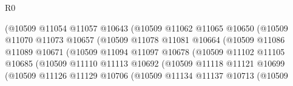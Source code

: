 \begin{lexlean}{R0}
\begin{coremodule}
                                        (@10509
                                          @11054
                                          @11057
                                          @10643
                                          (@10509
                                            @11062
                                            @11065
                                            @10650
                                            (@10509
                                              @11070
                                              @11073
                                              @10657
                                              (@10509
                                                @11078
                                                @11081
                                                @10664
                                                (@10509
                                                  @11086
                                                  @11089
                                                  @10671
                                                  (@10509
                                                    @11094
                                                    @11097
                                                    @10678
                                                    (@10509
                                                      @11102
                                                      @11105
                                                      @10685
                                                      (@10509
                                                        @11110
                                                        @11113
                                                        @10692
                                                        (@10509
                                                          @11118
                                                          @11121
                                                          @10699
                                                          (@10509
                                                            @11126
                                                            @11129
                                                            @10706
                                                            (@10509
                                                              @11134
                                                              @11137
                                                              @10713
                                                              (@10509

\end{coremodule}
\end{lexlean}

